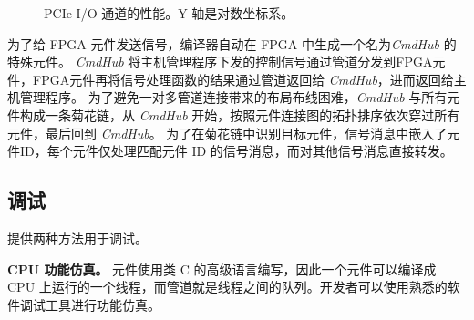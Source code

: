 \begin{figure}[htbp]
	\centering

	\caption{PCIe I/O 通道的性能。Y 轴是对数坐标系。}

	\label{clicknp:fig:pcie}
\end{figure}

为了给 FPGA 元件发送信号，\name 编译器自动在 FPGA 中生成一个名为\textit {CmdHub} 的特殊元件。
\textit {CmdHub} 将主机管理程序下发的控制信号通过管道分发到FPGA元件，FPGA元件再将信号处理函数的结果通过管道返回给 \textit {CmdHub}，进而返回给主机管理程序。
为了避免一对多管道连接带来的布局布线困难，\textit {CmdHub} 与所有元件构成一条菊花链，从 \textit {CmdHub} 开始，按照元件连接图的拓扑排序依次穿过所有元件，最后回到 \textit {CmdHub}。
为了在菊花链中识别目标元件，信号消息中嵌入了元件ID，每个元件仅处理匹配元件 ID 的信号消息，而对其他信号消息直接转发。
 


\subsection{调试}
\label{clicknp:subsec:debug}

\name 提供两种方法用于调试。

\textbf{CPU 功能仿真。}
\name 元件使用类 C 的高级语言编写，因此一个元件可以编译成 CPU 上运行的一个线程，而管道就是线程之间的队列。开发者可以使用熟悉的软件调试工具进行功能仿真。



